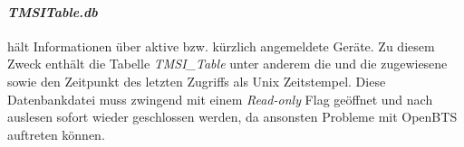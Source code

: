 \paragraph{\textit{TMSITable.db}} hält Informationen über aktive bzw. kürzlich angemeldete Geräte. Zu diesem Zweck enthält die Tabelle \textit{TMSI\_Table} unter anderem die \IMSI und die zugewiesene \TMSI sowie den Zeitpunkt des letzten Zugriffs als Unix Zeitstempel. Diese Datenbankdatei muss zwingend mit einem \textit{Read-only} Flag geöffnet und nach auslesen sofort wieder geschlossen werden, da ansonsten Probleme mit OpenBTS auftreten können.


